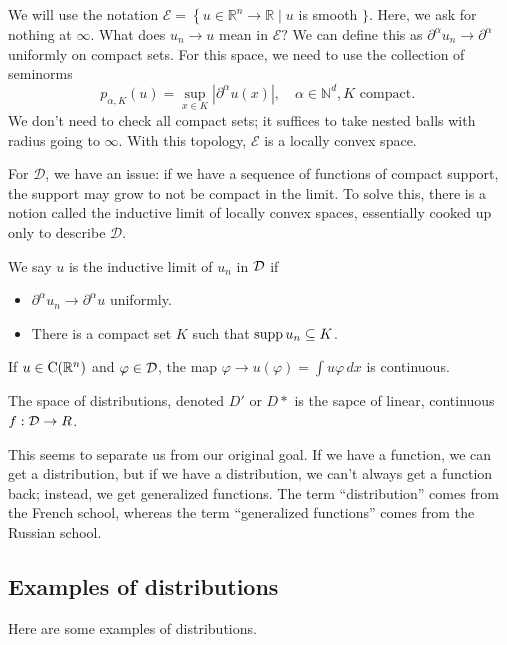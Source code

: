 \begin{example}
    We will use the notation $\mathcal{E}=\left\{u \in \mathbb{R}^{n} \rightarrow \mathbb{R} \mid u\right.$ is smooth $\} .$ Here, we ask for nothing at $\infty$. What does $u_{n} \rightarrow u$ mean in $\mathcal{E} ?$ We can define this as $\partial^{\alpha} u_{n} \rightarrow \partial^{\alpha}$ uniformly on compact sets. For this space, we need to use the collection of seminorms
    $$
    p_{\alpha, K}(u)=\sup _{x \in K}\left|\partial^{\alpha} u(x)\right|, \quad \alpha \in \mathbb{N}^{d}, K \text { compact. }
    $$
    We don't need to check all compact sets; it suffices to take nested balls with radius going to $\infty$. With this topology, $\mathcal{E}$ is a locally convex space.
\end{example}
For $\mathcal{D}$, we have an issue: if we have a sequence of functions of compact support, the support may grow to not be compact in the limit. To solve this, there is a notion called the inductive limit of locally convex spaces, essentially cooked up only to describe $\mathcal{D}$. 
\begin{definition}
    We say $u$ is the inductive limit of $u_n$ in $\mathcal{D}$ if 
    \begin{itemize}
        \item $\partial^\alpha u_n \to \partial^\alpha u$ uniformly.
        \item There is a compact set $K$ such that $\operatorname{supp} u_n \subseteq K$.
    \end{itemize}
\end{definition}

\begin{remark}
    If $u\in \operatorname{C}(\mathbb{R}^n)$ and $\varphi \in \mathcal{D}$, the map $\varphi \to u(\varphi) = \int u \varphi \, dx$ is continuous.
\end{remark}

\begin{definition}
 The space of distributions, denoted $D'$ or $D*$ is the sapce of linear, continuous $f:\mathcal{D} \to R$.
\end{definition}

This seems to separate us from our original goal. If we have a function, we can get a
distribution, but if we have a distribution, we can’t always get a function back; instead,
we get generalized functions. The term ``distribution'' comes from the French school, whereas the term ``generalized functions'' comes
from the Russian school.

\subsection{Examples of distributions}
Here are some examples of distributions.


